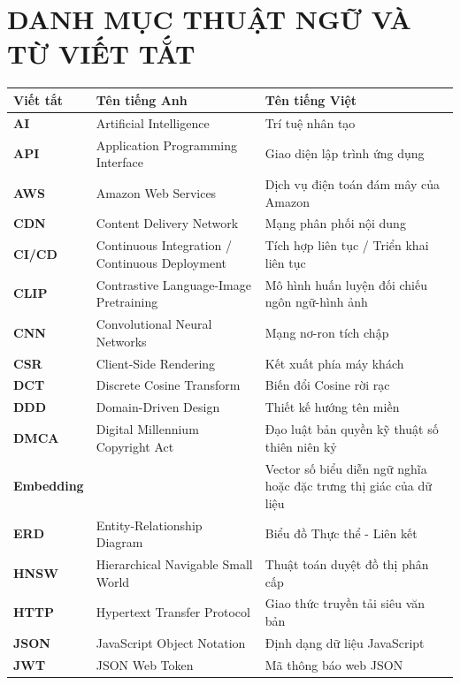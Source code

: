 \chapter*{DANH MỤC THUẬT NGỮ VÀ TỪ VIẾT TẮT}

\begin{longtable}{p{} p{} p{}}
\hline
\textbf{Viết tắt} & \textbf{Tên tiếng Anh} & \textbf{Tên tiếng Việt} \\
\hline
\endhead

\hline
\endfoot

\textbf{AI} & Artificial Intelligence & Trí tuệ nhân tạo \\
\textbf{API} & Application Programming Interface & Giao diện lập trình ứng dụng \\
\textbf{AWS} & Amazon Web Services & Dịch vụ điện toán đám mây của Amazon \\
\textbf{CDN} & Content Delivery Network & Mạng phân phối nội dung \\
\textbf{CI/CD} & Continuous Integration / Continuous Deployment & Tích hợp liên tục / Triển khai liên tục \\
\textbf{CLIP} & Contrastive Language-Image Pretraining & Mô hình huấn luyện đối chiếu ngôn ngữ-hình ảnh \\
\textbf{CNN} & Convolutional Neural Networks & Mạng nơ-ron tích chập \\
\textbf{CSR} & Client-Side Rendering & Kết xuất phía máy khách \\
\textbf{DCT} & Discrete Cosine Transform & Biến đổi Cosine rời rạc \\
\textbf{DDD} & Domain-Driven Design & Thiết kế hướng tên miền \\
\textbf{DMCA} & Digital Millennium Copyright Act & Đạo luật bản quyền kỹ thuật số thiên niên kỷ \\
\textbf{Embedding} & & Vector số biểu diễn ngữ nghĩa hoặc đặc trưng thị giác của dữ liệu \\
\textbf{ERD} & Entity-Relationship Diagram & Biểu đồ Thực thể - Liên kết \\
\textbf{HNSW} & Hierarchical Navigable Small World & Thuật toán duyệt đồ thị phân cấp \\
\textbf{HTTP} & Hypertext Transfer Protocol & Giao thức truyền tải siêu văn bản \\
\textbf{JSON} & JavaScript Object Notation & Định dạng dữ liệu JavaScript \\
\textbf{JWT} & JSON Web Token & Mã thông báo web JSON \\

\end{longtable}
